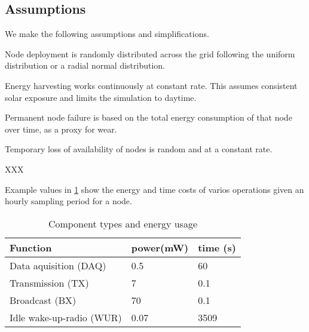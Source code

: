 	\subsection{Assumptions}
	We make the following assumptions and simplifications.
	\begin{itemize}{
			\item Node deployment is randomly distributed across the grid following the uniform distribution or a radial normal distribution.
			\item Energy harvesting works continuously at constant rate. This assumes consistent solar exposure and limits the simulation to daytime.
			\item Permanent node failure is based on the total energy consumption of that node over time, as a proxy for wear.
			\item Temporary loss of availability of nodes is random and at a constant rate.
		}
	\end{itemize}
	
	
	
	
	\begin{definition}[Energy]
		XXX
	\end{definition}
	
	
	Example values in \ref{table:components_energy_usage} show the energy and time costs of varios operations given an hourly sampling period for a node.
	
	
	\begin{table}
		\begin{tabular}{p{}p{} p{} }
			\hline
			Function & power(mW) & time (s) \\
			\hline
			Data aquisition (DAQ) & 0.5 & 60 \\
			Transmission (TX) & 7 & 0.1 \\
			Broadcast (BX) & 70 & 0.1 \\
			Idle wake-up-radio (WUR) & 0.07 & 3509 \\
		\end{tabular}
		\caption{Component types and energy usage}
		\label{table:components_energy_usage}
	\end{table}
	